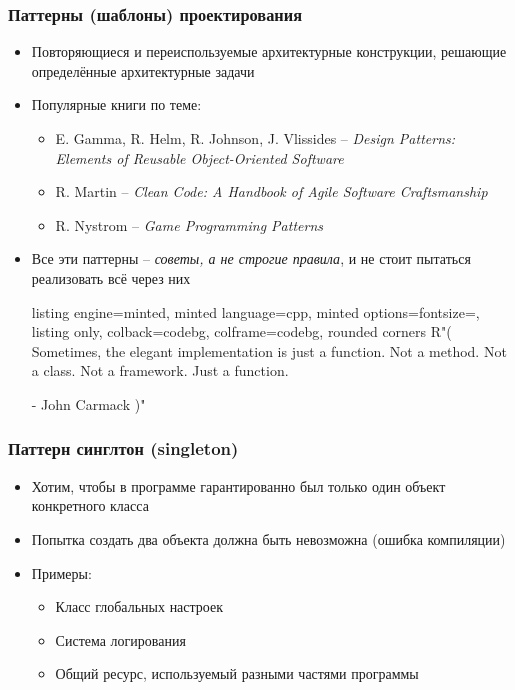\documentclass[10pt]{beamer}
\begin{document}
\begin{frame}[fragile]
\frametitle{Паттерны (шаблоны) проектирования}
\begin{itemize}
\item Повторяющиеся и переиспользуемые архитектурные конструкции, решающие определённые архитектурные задачи
\pause
\item Популярные книги по теме:
\begin{itemize}
\item E. Gamma, R. Helm, R. Johnson, J. Vlissides -- \textit{Design Patterns: Elements of Reusable Object-Oriented Software}
\item R. Martin -- \textit{Clean Code: A Handbook of Agile Software Craftsmanship}
\item R. Nystrom -- \textit{Game Programming Patterns}
\end{itemize}
\pause
\item Все эти паттерны -- \textit{советы, а не строгие правила}, и не стоит пытаться реализовать всё через них
\pause
\begin{tcblisting}{listing engine=minted, minted language=cpp, minted options={fontsize=\scriptsize}, listing only, colback=codebg, colframe=codebg, rounded corners}
R"(
  Sometimes, the elegant implementation is just a function. 
  Not a method. Not a class. Not a framework.
  Just a function.

    - John Carmack
)"
\end{tcblisting}
\end{itemize}
\end{frame}

\begin{frame}[fragile]
\frametitle{Паттерн синглтон (singleton)}
\begin{itemize}
\item Хотим, чтобы в программе гарантированно был только один объект конкретного класса
\pause
\item Попытка создать два объекта должна быть невозможна (ошибка компиляции)
\pause
\item Примеры:
\pause
\begin{itemize}
\item Класс глобальных настроек
\pause
\item Система логирования
\pause
\item Общий ресурс, используемый разными частями программы
\end{itemize}
\end{itemize}
\end{frame}
\end{document}
